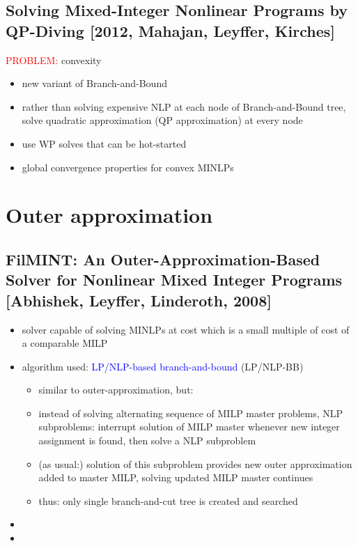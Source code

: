 \documentclass{article}
\begin{document}
\subsection{Solving Mixed-Integer Nonlinear Programs by QP-Diving [2012, Mahajan, Leyffer, Kirches]}
\textcolor{red}{PROBLEM:} convexity
\begin{itemize}
\item new variant of Branch-and-Bound
\item rather than solving expensive NLP at each node of Branch-and-Bound tree, solve quadratic approximation (QP approximation) at every node
\item use WP solves that can be hot-started
\item global convergence properties for convex MINLPs
\end{itemize}

\newpage
\section{Outer approximation}

\subsection{FilMINT: An Outer-Approximation-Based Solver for Nonlinear Mixed Integer Programs [Abhishek, Leyffer, Linderoth, 2008]}
\begin{itemize}
\item solver capable of solving MINLPs at cost which is a small multiple of cost of a comparable MILP
\item algorithm used: \textcolor{blue}{LP/NLP-based branch-and-bound} (LP/NLP-BB) \cite{quesada1992lp}
\begin{itemize}
\item similar to outer-approximation, but:
\item instead of solving alternating sequence of MILP master problems, NLP subproblems: interrupt solution of MILP master whenever new integer assignment is found, then solve a NLP subproblem
\item (as usual:) solution of this subproblem provides new outer approximation added to master MILP, solving updated MILP master continues
\item thus: only single branch-and-cut tree is created and searched
\end{itemize}
\item 
\item 
\end{itemize}
\end{document}
